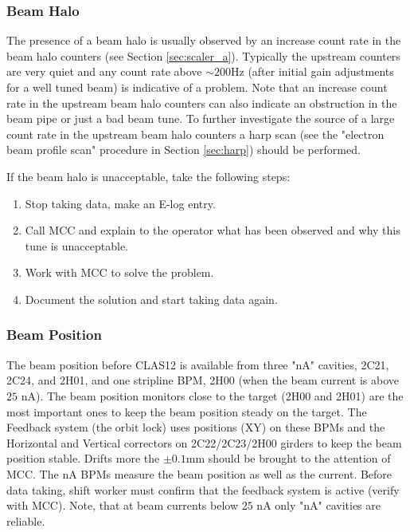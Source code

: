 \documentclass[12pt]{article}
\begin{document}
\subsubsection{Beam Halo}
\indent

The presence of a beam halo is usually observed by an increase count rate in
the beam halo counters (see Section \ref{sec:scaler_a}). Typically
the upstream counters are very quiet and any count rate above $\sim 200$Hz (after initial gain adjustments for a well tuned beam) is indicative
of a problem. Note that an increase count rate in the upstream beam halo counters
can also indicate an obstruction in the beam pipe or just a bad beam tune. To 
further investigate the source of a large count rate in the upstream beam halo
counters a harp scan (see the "electron beam profile scan" procedure in Section \ref{sec:harp}) should be performed. 

If the beam halo is unacceptable, take the following steps:

\begin{enumerate}
\item Stop taking data, make an E-log entry.
\item Call MCC and explain to the operator what has been observed and why this tune
is unacceptable.
\item Work with MCC to solve the problem.
\item Document the solution and start taking data again.
\end{enumerate}

\subsubsection{Beam Position}
\indent

The beam position before CLAS12 is available from three "nA" cavities, 2C21, 2C24, and 2H01, and one stripline BPM, 2H00 (when the beam current is above $25$ nA). The beam position monitors close to the target (2H00 and 2H01) are the most important ones to keep the beam position steady on the target. The Feedback system (the orbit lock) uses positions (XY) on these BPMs and the Horizontal and Vertical correctors on 2C22/2C23/2H00 girders to keep the beam position stable. Drifts more the \( \pm 0.1 \)mm
should be brought to the attention of MCC. The nA BPMs measure the beam position as well as the current. Before data taking, shift worker must confirm that the feedback system is active (verify with MCC). Note, that at beam currents below $25$ nA only "nA" cavities are reliable. 
\end{document}
